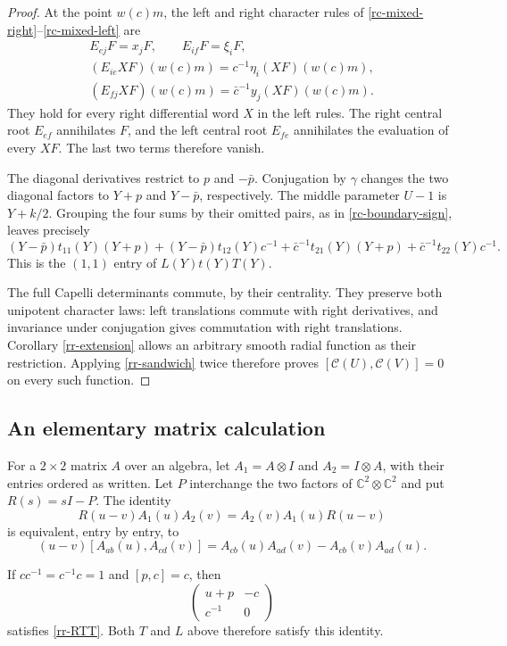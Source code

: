 \begin{proof}
At the point $w(c)m$, the left and right character
rules of \eqref{rc-mixed-right}--\eqref{rc-mixed-left}
are
\[
 \begin{gathered}
 E_{ej}F=x_jF,\qquad E_{if}F=\xi_iF,\\
 (E_{ie}XF)(w(c)m)=c^{-1}\eta_i(XF)(w(c)m),\\
 (E_{fj}XF)(w(c)m)=\bar c^{-1}y_j(XF)(w(c)m).
 \end{gathered}
\]
They hold for every right differential word $X$ in
the left rules.  The right central root $E_{ef}$
annihilates $F$, and the left central root $E_{fe}$
annihilates the evaluation of every $XF$.
The last two terms therefore vanish.

The diagonal derivatives restrict to $p$ and $-\bar p$.
Conjugation by $\gamma$ changes the two diagonal
factors to $Y+p$ and $Y-\bar p$, respectively.
The middle parameter $U-1$ is $Y+k/2$.
Grouping the four sums by their omitted pairs,
as in \eqref{rc-boundary-sign}, leaves precisely
\[
 (Y-\bar p)t_{11}(Y)(Y+p)
 +(Y-\bar p)t_{12}(Y)c^{-1}
 +\bar c^{-1}t_{21}(Y)(Y+p)
 +\bar c^{-1}t_{22}(Y)c^{-1}.
\]
This is the $(1,1)$ entry of $L(Y)t(Y)T(Y)$.

The full Capelli determinants commute, by their
centrality.  They preserve both unipotent character
laws: left translations commute with right
derivatives, and invariance under conjugation gives
commutation with right translations.  Corollary
\ref{rr-extension} allows an arbitrary smooth radial
function as their restriction.  Applying
\eqref{rr-sandwich} twice therefore proves
$[\mathcal C(U),\mathcal C(V)]=0$ on every such function.
\end{proof}

\subsection{An elementary matrix calculation}

For a $2\times2$ matrix $A$ over an algebra, let
$A_1=A\otimes I$ and $A_2=I\otimes A$, with their
entries ordered as written.  Let $P$ interchange the
two factors of $\mathbb C^2\otimes\mathbb C^2$ and put
$R(s)=sI-P$.
The identity
\[
 R(u-v)A_1(u)A_2(v)=A_2(v)A_1(u)R(u-v)
\]
is equivalent, entry by entry, to
\begin{equation}\label{rr-RTT}
 (u-v)[A_{ab}(u),A_{cd}(v)]
       =A_{cb}(u)A_{ad}(v)-A_{cb}(v)A_{ad}(u).
\end{equation}

\begin{lemma}\label{rr-Weyl}
If $cc^{-1}=c^{-1}c=1$ and $[p,c]=c$, then
\[
                  \begin{pmatrix}u+p&-c\\c^{-1}&0\end{pmatrix}
\]
satisfies \eqref{rr-RTT}.
Both $T$ and $L$ above therefore satisfy this identity.
\end{lemma}

